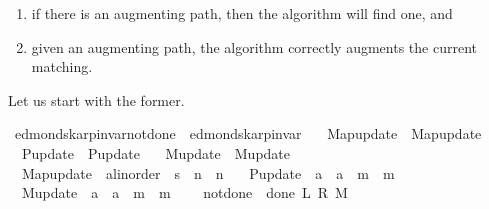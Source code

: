 \begin{isabellebody}
\begin{isamarkuptext}
%
\begin{enumerate}%
\item if there is an augmenting path, then the algorithm will find one, and

\item given an augmenting path, the algorithm correctly augments the current matching.%
\end{enumerate}


Let us start with the former.%
\end{isamarkuptext}\isamarkuptrue%
\isamarkupfalse%
\ edmonds{\isacharunderscore}{\kern0pt}karp{\isacharunderscore}{\kern0pt}invar{\isacharunderscore}{\kern0pt}not{\isacharunderscore}{\kern0pt}done{\isacharunderscore}{\kern0pt}{}\ {\isacharequal}{\kern0pt}\ edmonds{\isacharunderscore}{\kern0pt}karp{\isacharunderscore}{\kern0pt}invar\ \isanewline
\ \ Map{\isacharunderscore}{\kern0pt}update\ {\isacharequal}{\kern0pt}\ Map{\isacharunderscore}{\kern0pt}update\ \isanewline
\ \ P{\isacharunderscore}{\kern0pt}update\ {\isacharequal}{\kern0pt}\ P{\isacharunderscore}{\kern0pt}update\ \isanewline
\ \ M{\isacharunderscore}{\kern0pt}update\ {\isacharequal}{\kern0pt}\ M{\isacharunderscore}{\kern0pt}update\ \isanewline
\ \ Map{\isacharunderscore}{\kern0pt}update\ {\isacharcolon}{\kern0pt}{\isacharcolon}{\kern0pt}\ {\isachardoublequoteopen}{\isacharprime}{\kern0pt}a{\isacharcolon}{\kern0pt}{\isacharcolon}{\kern0pt}linorder\ {\isasymRightarrow}\ {\isacharprime}{\kern0pt}s\ {\isasymRightarrow}\ {\isacharprime}{\kern0pt}n\ {\isasymRightarrow}\ {\isacharprime}{\kern0pt}n{\isachardoublequoteclose}\ \isanewline
\ \ P{\isacharunderscore}{\kern0pt}update\ {\isacharcolon}{\kern0pt}{\isacharcolon}{\kern0pt}\ {\isachardoublequoteopen}{\isacharprime}{\kern0pt}a\ {\isasymRightarrow}\ {\isacharprime}{\kern0pt}a\ {\isasymRightarrow}\ {\isacharprime}{\kern0pt}m\ {\isasymRightarrow}\ {\isacharprime}{\kern0pt}m{\isachardoublequoteclose}\ \isanewline
\ \ M{\isacharunderscore}{\kern0pt}update\ {\isacharcolon}{\kern0pt}{\isacharcolon}{\kern0pt}\ {\isachardoublequoteopen}{\isacharprime}{\kern0pt}a\ {\isasymRightarrow}\ {\isacharprime}{\kern0pt}a\ {\isasymRightarrow}\ {\isacharprime}{\kern0pt}m\ {\isasymRightarrow}\ {\isacharprime}{\kern0pt}m{\isachardoublequoteclose}\ {\isacharplus}{\kern0pt}\isanewline
\ \ \ not{\isacharunderscore}{\kern0pt}done{\isacharunderscore}{\kern0pt}{}{\isacharcolon}{\kern0pt}\ {\isachardoublequoteopen}{\isasymnot}\ done{\isacharunderscore}{\kern0pt}{}\ L\ R\ M{\isachardoublequoteclose}\isanewline

\end{isabellebody}
